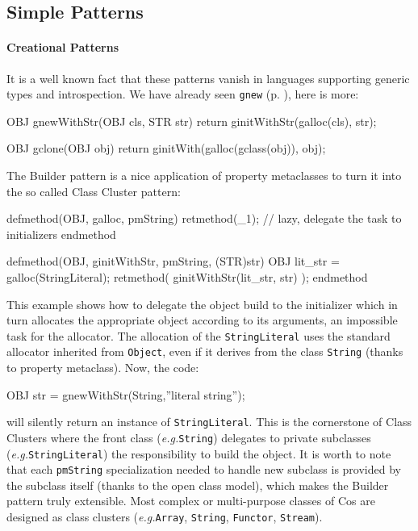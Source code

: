 \documentclass[preprint,10pt]{sigplanconf}
\newcommand{\abbrev}[1]{{\em #1}\xspace}
\newcommand{\eg}{\abbrev{e.g.}}
\newcommand{\ProgLang}[1]{{\sc #1}\xspace}
\newcommand{\Cos}       {\ProgLang{Cos}}
\newcommand{\code}[1]{\lstinline[language=COS,style=samplecode]|#1|}
\begin{document}
\subsection{Simple Patterns\label{ssec:spat}}

\paragraph{Creational Patterns}

It is a well known fact that these patterns vanish in languages supporting generic types and introspection. We have already seen \code{gnew} (p. \pageref{par:new}), here is more:
\begin{COS}
OBJ gnewWithStr(OBJ cls, STR str) {
  return ginitWithStr(galloc(cls), str);
}

OBJ gclone(OBJ obj) {
  return ginitWith(galloc(gclass(obj)), obj);
}
\end{COS}
The Builder pattern is a nice application of property metaclasses to turn it into the so called Class Cluster pattern:
\begin{COS}
defmethod(OBJ, galloc, pmString)
  retmethod(_1); // lazy, delegate the task to initializers
endmethod

defmethod(OBJ, ginitWithStr, pmString, (STR)str)
  OBJ lit_str = galloc(StringLiteral);
  retmethod( ginitWithStr(lit_str, str) );
endmethod
\end{COS}
This example shows how to delegate the object build to the initializer which in turn allocates the appropriate object according to its arguments, an impossible task for the allocator. The allocation of the \code{StringLiteral} uses the standard allocator inherited from \code{Object}, even if it derives from the class \code{String} (thanks to property metaclass). Now, the code:
\begin{COS}
OBJ str = gnewWithStr(String,''literal string'');
\end{COS}
will silently return an instance of \code{StringLiteral}. This is the cornerstone of Class Clusters where the front class (\eg \code{String}) delegates to private subclasses (\eg \code{StringLiteral}) the responsibility to build the object. It is worth to note that each \code{pmString} specialization needed to handle new subclass is provided by the subclass itself (thanks to the open class model), which makes the Builder pattern truly extensible. Most complex or multi-purpose classes of \Cos are designed as class clusters (\eg \code{Array}, \code{String}, \code{Functor}, \code{Stream}).
\end{document}
